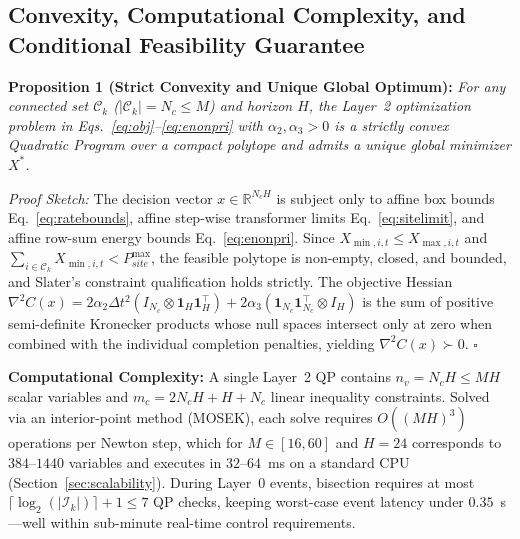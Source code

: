 \documentclass[final,3p,times,twocolumn]{elsarticle}
\begin{document}
\subsection{Convexity, Computational Complexity, and Conditional Feasibility Guarantee}
\label{sec:theory}

\textbf{Proposition 1 (Strict Convexity and Unique Global Optimum):} \textit{For any connected set $\mathcal{C}_k$ ($|\mathcal{C}_k| = N_c \le M$) and horizon $H$, the Layer~2 optimization problem in Eqs.~\eqref{eq:obj}--\eqref{eq:enonpri} with $\alpha_2, \alpha_3 > 0$ is a strictly convex Quadratic Program over a compact polytope and admits a unique global minimizer $X^*$.}

\textit{Proof Sketch:} The decision vector $x \in \mathbb{R}^{N_c H}$ is subject only to affine box bounds Eq.~\eqref{eq:ratebounds}, affine step-wise transformer limits Eq.~\eqref{eq:sitelimit}, and affine row-sum energy bounds Eq.~\eqref{eq:enonpri}. Since $X_{\min,i,t} \le X_{\max,i,t}$ and $\sum_{i \in \mathcal{C}_k} X_{\min,i,t} < P_{site}^{\max}$, the feasible polytope is non-empty, closed, and bounded, and Slater's constraint qualification holds strictly. The objective Hessian $\nabla^2 C(x) = 2\alpha_2 \Delta t^2 (I_{N_c} \otimes \mathbf{1}_H \mathbf{1}_H^\top) + 2\alpha_3 (\mathbf{1}_{N_c}\mathbf{1}_{N_c}^\top \otimes I_H)$ is the sum of positive semi-definite Kronecker products whose null spaces intersect only at zero when combined with the individual completion penalties, yielding $\nabla^2 C(x) \succ 0$. $\square$

\textbf{Computational Complexity:} A single Layer~2 QP contains $n_v = N_c H \le M H$ scalar variables and $m_c = 2 N_c H + H + N_c$ linear inequality constraints. Solved via an interior-point method (MOSEK), each solve requires $O((M H)^3)$ operations per Newton step, which for $M \in [16, 60]$ and $H = 24$ corresponds to $384\text{--}1440$ variables and executes in $32\text{--}64$~ms on a standard CPU (Section~\ref{sec:scalability}). During Layer~0 events, bisection requires at most $\lceil \log_2(|\mathcal{I}_k|) \rceil + 1 \le 7$ QP checks, keeping worst-case event latency under $0.35$~s---well within sub-minute real-time control requirements.
\end{document}
